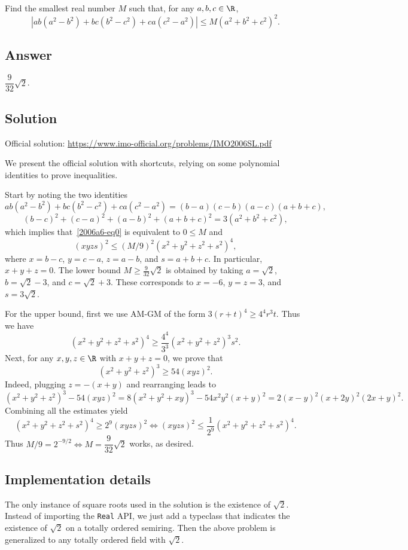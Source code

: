 Find the smallest real number $M$ such that, for any $a, b, c \in \R$,
\[ |ab(a^2 - b^2) + bc(b^2 - c^2) + ca(c^2 - a^2)| \leq M(a^2 + b^2 + c^2)^2. \tag{*}\label{2006a6-eq0} \]



\subsection*{Answer}

$\dfrac{9}{32} \sqrt{2}$.



\subsection*{Solution}

Official solution: \url{https://www.imo-official.org/problems/IMO2006SL.pdf}

We present the official solution with shortcuts, relying on some polynomial identities to prove inequalities.

Start by noting the two identities
\[ ab(a^2 - b^2) + bc(b^2 - c^2) + ca(c^2 - a^2) = (b - a)(c - b)(a - c)(a + b + c), \]
\[ (b - c)^2 + (c - a)^2 + (a - b)^2 + (a + b + c)^2 = 3(a^2 + b^2 + c^2), \]
    which implies that~\eqref{2006a6-eq0} is equivalent to $0 \leq M$ and
\[ (xyzs)^2 \leq (M/9)^2 (x^2 + y^2 + z^2 + s^2)^4, \tag{*}\label{2006a6-eq1} \]
    where $x = b - c$, $y = c - a$, $z = a - b$, and $s = a + b + c$.
In particular, $x + y + z = 0$.
The lower bound $M \geq \frac{9}{32} \sqrt{2}$ is obtained by taking $a = \sqrt{2}$, $b = \sqrt{2} - 3$, and $c = \sqrt{2} + 3$.
These corresponds to $x = -6$, $y = z = 3$, and $s = 3 \sqrt{2}$.

For the upper bound, first we use AM-GM of the form $3(r + t)^4 \geq 4^4 r^3 t$.
Thus we have
\[ (x^2 + y^2 + z^2 + s^2)^4 \geq \frac{4^4}{3^3} (x^2 + y^2 + z^2)^3 s^2. \]
Next, for any $x, y, z \in \R$ with $x + y + z = 0$, we prove that
\[ (x^2 + y^2 + z^2)^3 \geq 54 (xyz)^2. \]
Indeed, plugging $z = -(x + y)$ and rearranging leads to
\[ (x^2 + y^2 + z^2)^3 - 54 (xyz)^2 = 8(x^2 + y^2 + xy)^3 - 54 x^2 y^2 (x + y)^2 = 2 (x - y)^2 (x + 2y)^2 (2x + y)^2. \]
Combining all the estimates yield
\[ (x^2 + y^2 + z^2 + s^2)^4 \geq 2^9 (xyzs)^2 \iff (xyzs)^2 \leq \frac{1}{2^9} (x^2 + y^2 + z^2 + s^2)^4. \]
Thus $M/9 = 2^{-9/2} \iff M = \dfrac{9}{32} \sqrt{2}$ works, as desired.



\subsection*{Implementation details}

The only instance of square roots used in the solution is the existence of $\sqrt{2}$.
Instead of importing the \texttt{Real} API, we just add a typeclass that indicates the existence of $\sqrt{2}$ on a totally ordered semiring.
Then the above problem is generalized to any totally ordered field with $\sqrt{2}$.
